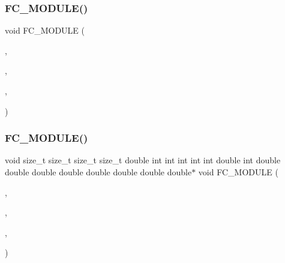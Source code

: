 \hypertarget{EulerKernels_8H_aad08baf809ba587debd251c64396f241}{}\label{EulerKernels_8H_aad08baf809ba587debd251c64396f241} 
\subsubsection{\texorpdfstring{F\+C\+\_\+\+M\+O\+D\+U\+L\+E()}{FC\_MODULE()}\hspace{0.1cm}{\footnotesize\ttfamily [3/6]}}
{\footnotesize\ttfamily void F\+C\+\_\+\+M\+O\+D\+U\+LE (\begin{DoxyParamCaption}\item[{euler}]{,  }\item[{uniformrhs}]{,  }\item[{E\+U\+L\+ER}]{,  }\item[{U\+N\+I\+F\+O\+R\+M\+R\+HS}]{ }\end{DoxyParamCaption})}

\hypertarget{EulerKernels_8H_a47ef30eedb5748843ea14cae8bb78001}{}\label{EulerKernels_8H_a47ef30eedb5748843ea14cae8bb78001} 
\subsubsection{\texorpdfstring{F\+C\+\_\+\+M\+O\+D\+U\+L\+E()}{FC\_MODULE()}\hspace{0.1cm}{\footnotesize\ttfamily [4/6]}}
{\footnotesize\ttfamily void size\+\_\+t size\+\_\+t size\+\_\+t size\+\_\+t double int int int int int double int double double double double double double double double$\ast$ void F\+C\+\_\+\+M\+O\+D\+U\+LE (\begin{DoxyParamCaption}\item[{euler}]{,  }\item[{uniformscalarrhs}]{,  }\item[{E\+U\+L\+ER}]{,  }\item[{U\+N\+I\+F\+O\+R\+M\+S\+C\+A\+L\+A\+R\+R\+HS}]{ }\end{DoxyParamCaption})}

\hypertarget{EulerKernels_8H_ac853d92c33d648f5573460c374b7da43}{}\label{EulerKernels_8H_ac853d92c33d648f5573460c374b7da43} 
